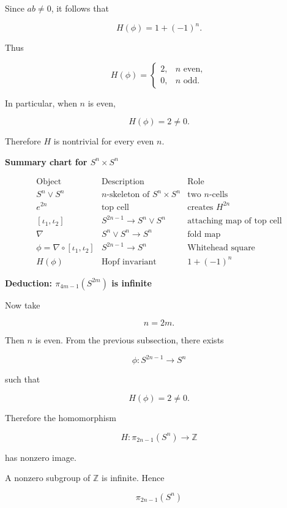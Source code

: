 \begin{solution}
Since \(ab\neq 0\), it follows that

\[
\boxed{
	H(\phi)=1+(-1)^n.
}
\]

Thus

\[
H(\phi)=
\begin{cases}
	2, & n\text{ even},\\
	0, & n\text{ odd}.
\end{cases}
\]

In particular, when \(n\) is even,

\[
\boxed{
	H(\phi)=2\neq 0.
}
\]

Therefore \(H\) is nontrivial for every even \(n\).


\medskip
\noindent\textbf{Summary chart for \(S^n\times S^n\)}\par
\smallskip


\[
\begin{array}{c|c|c}
	\text{Object} & \text{Description} & \text{Role}\\ \hline
	S^n\vee S^n & n\text{-skeleton of }S^n\times S^n & \text{two }n\text{-cells}\\
	e^{2n} & \text{top cell} & \text{creates }H^{2n}\\
	\left[\iota_1,\iota_2\right] & S^{2n-1}\to S^n\vee S^n & \text{attaching map of top cell}\\
	\nabla & S^n\vee S^n\to S^n & \text{fold map}\\
	\phi=\nabla\circ\left[\iota_1,\iota_2\right] & S^{2n-1}\to S^n & \text{Whitehead square}\\
	H(\phi) & \text{Hopf invariant} & 1+(-1)^n
\end{array}
\]


\medskip
\noindent\textbf{Deduction: \(\pi_{4m-1}(S^{2m})\) is infinite}\par
\smallskip


Now take

\[
n=2m.
\]

Then \(n\) is even. From the previous subsection, there exists

\[
\phi:S^{2n-1}\to S^n
\]

such that

\[
H(\phi)=2\neq 0.
\]

Therefore the homomorphism

\[
H:\pi_{2n-1}(S^n)\to \mathbb Z
\]

has nonzero image.

A nonzero subgroup of \(\mathbb Z\) is infinite. Hence

\[
\pi_{2n-1}(S^n)
\]


\end{solution}
